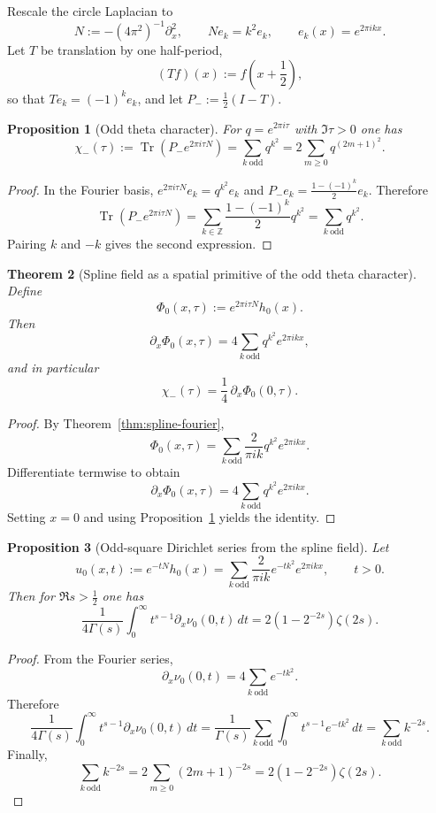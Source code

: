 \documentclass[11pt,a4paper]{article}
\numberwithin{equation}{section}
\newtheorem{theorem}{Theorem}[section]
\newtheorem{proposition}[theorem]{Proposition}
\theoremstyle{definition}
\theoremstyle{remark}
\newcommand{\ZZ}{\mathbb Z}
\begin{document}
Rescale the circle Laplacian to
\[
N:=-(4\pi^2)^{-1}\partial_x^2,
\qquad
Ne_k=k^2e_k,
\qquad e_k(x)=e^{2\pi ikx}.
\]
Let $T$ be translation by one half-period,
\[
(Tf)(x):=f\!\left(x+\frac12\right),
\]
so that $Te_k=(-1)^k e_k$, and let $P_-:=\frac12(I-T)$.

\begin{proposition}[Odd theta character]\label{prop:odd-theta-character}
For $q=e^{2\pi i\tau}$ with $\Im\tau>0$ one has
\[
\chi_-(\tau):=\operatorname{Tr}(P_-e^{2\pi i\tau N})
=\sum_{k\ \mathrm{odd}} q^{k^2}
=2\sum_{m\ge 0} q^{(2m+1)^2}.
\]
\end{proposition}

\begin{proof}
In the Fourier basis, $e^{2\pi i\tau N}e_k=q^{k^2}e_k$ and $P_-e_k=\frac{1-(-1)^k}{2}e_k$.  Therefore
\[
\operatorname{Tr}(P_-e^{2\pi i\tau N})
=\sum_{k\in\ZZ} \frac{1-(-1)^k}{2} q^{k^2}
=\sum_{k\ \mathrm{odd}} q^{k^2}.
\]
Pairing $k$ and $-k$ gives the second expression.
\end{proof}

\begin{theorem}[Spline field as a spatial primitive of the odd theta character]\label{thm:spline-theta}
Define
\[
\Phi_0(x,\tau):=e^{2\pi i\tau N}h_0(x).
\]
Then
\[
\partial_x\Phi_0(x,\tau)=4\sum_{k\ \mathrm{odd}} q^{k^2}e^{2\pi ikx},
\]
and in particular
\[
\chi_-(\tau)=\frac14\,\partial_x\Phi_0(0,\tau).
\]
\end{theorem}

\begin{proof}
By Theorem~\ref{thm:spline-fourier},
\[
\Phi_0(x,\tau)=\sum_{k\ \mathrm{odd}} \frac{2}{\pi i k}q^{k^2}e^{2\pi ikx}.
\]
Differentiate termwise to obtain
\[
\partial_x\Phi_0(x,\tau)=4\sum_{k\ \mathrm{odd}} q^{k^2}e^{2\pi ikx}.
\]
Setting $x=0$ and using Proposition~\ref{prop:odd-theta-character} yields the identity.
\end{proof}

\begin{proposition}[Odd-square Dirichlet series from the spline field]\label{prop:odd-square-dirichlet}
Let
\[
u_0(x,t):=e^{-tN}h_0(x)
=\sum_{k\ \mathrm{odd}}\frac{2}{\pi i k}e^{-tk^2}e^{2\pi ikx},
\qquad t>0.
\]
Then for $\Re s>\tfrac12$ one has
\[
\frac{1}{4\Gamma(s)}\int_0^\infty t^{s-1}\partial_x \nu_0(0,t)\,dt
=2(1-2^{-2s})\zeta(2s).
\]
\end{proposition}

\begin{proof}
From the Fourier series,
\[
\partial_x\nu_0(0,t)=4\sum_{k\ \mathrm{odd}} e^{-tk^2}.
\]
Therefore
\[
\frac{1}{4\Gamma(s)}\int_0^\infty t^{s-1}\partial_x \nu_0(0,t)\,dt
=\frac{1}{\Gamma(s)}\sum_{k\ \mathrm{odd}}\int_0^\infty t^{s-1}e^{-tk^2}\,dt
=\sum_{k\ \mathrm{odd}}k^{-2s}.
\]
Finally,
\[
\sum_{k\ \mathrm{odd}}k^{-2s}=2\sum_{m\ge 0}(2m+1)^{-2s}=2(1-2^{-2s})\zeta(2s).
\]
\end{proof}
\end{document}
